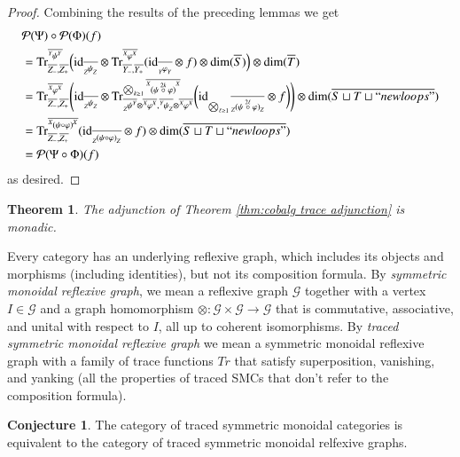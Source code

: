 \documentclass{amsart}
\def\tn{\textnormal}
\def\mc{\mathcal}
\def\dim{\tn{dim}}
\def\Trace{\tn{Tr}}
\def\to{\rightarrow}
\def\taking{\colon}
\def\ol{\overline}
\def\id{\tn{id}}
\def\mcG{\mc{G}}
\def\mcP{\mc{P}}
\newcommand{\inp}[1]{{#1_-}}
\newcommand{\outp}[1]{{#1_+}}
\newcommand{\feeddd}[3]{{\tensor*[^{#2}_{\color{white}{!}}]{{#1}}{^{#3}}}}%
\newcommand{\feeddc}[3]{{\tensor*[^{#2}]{{#1}}{_{#3}}}}
\newcommand{\feedcd}[3]{{\tensor*[_{#2}]{{#1}}{^{#3}}}}
\newcommand{\feedcc}[3]{{\tensor*[^{\color{white}{!}}_{#2}]{{#1}}{_{#3}}}}
\newtheorem{theorem}[subsubsection]{Theorem}
\theoremstyle{remark}
\theoremstyle{definition}
\newtheorem{conjecture}[subsubsection]{Conjecture}
\begin{document}
\begin{proof}
Combining the results of the preceding lemmas we get
\begin{align*}
&\mcP(\Psi)\circ\mcP(\Phi)(f)\\
&=
\Trace^{\ol{\feeddd{\psi}{Y}{Y}}}_{\ol{Z_-},\ol{Z_+}}
\Big(
\id_{\ol{\feedcc{\psi}{Z}{Z}}}\otimes
\Trace^{\ol{\feeddd{\varphi}{X}{X}}}_{\ol{Y_-},\ol{Y_+}}(\id_{\ol{\feedcc{\varphi}{Y}{Y}}}\otimes f)\otimes\dim(\ol{S})
\Big)
\otimes\dim(\ol{T})\\
&=\Trace^{\ol{\feeddd{\varphi}{X}{X}}}_{\ol{\inp{Z}},\ol{\outp{Z}}}
\Bigg(
\id_{\ol{\feedcc{\psi}{Z}{Z}}}\otimes\Trace^{\bigotimes_{k\ge1}\ol{\feeddd{(\psi\;\accentset{2k}{\circ}\;\varphi)}{X}{X}}
}_{\ol{\feedcd{\psi}{Z}{Y}}\otimes\ol{\feeddd{\varphi}{X}{X}},\ol{\feeddc{\psi}{Y}{Z}}\otimes\ol{\feeddd{\varphi}{X}{X}}}
\bigg(
\id_{\bigotimes_{\ell\ge1}\ol{\feedcc{(\psi\;\accentset{2\ell}{\circ}\;\varphi)}{Z}{Z}}
}\otimes f
\bigg)
\Bigg)\otimes\dim(\ol{S\sqcup T\sqcup ``newloops"})\\
&=\Trace^{\ol{\feeddd{(\psi\circ\varphi)}{X}{X}}}_{\ol{Z_-},\ol{Z_+}}(\id_{\ol{\feedcc{(\psi\circ\varphi)}{Z}{Z}}}\otimes f)\otimes\dim(\ol{S\sqcup T\sqcup ``newloops"})\\
&=\mcP(\Psi\circ\Phi)(f)
\end{align*}
as desired.
\end{proof}

\begin{theorem}

The adjunction of Theorem \ref{thm:cobalg trace adjunction} is monadic. 

\end{theorem}

Every category has an underlying reflexive graph, which includes its objects and morphisms (including identities), but not its composition formula. By {\em symmetric monoidal reflexive graph}, we mean a reflexive graph $\mcG$ together with a vertex $I\in \mcG$ and a graph homomorphism $\otimes\taking\mcG\times\mcG\to\mcG$ that is commutative, associative, and unital with respect to $I$, all up to coherent isomorphisms. By {\em traced symmetric monoidal reflexive graph} we mean a symmetric monoidal reflexive graph with a family of trace functions $Tr$ that satisfy superposition, vanishing, and yanking (all the properties of traced SMCs that don't refer to the composition formula).

\begin{conjecture}
The category of traced symmetric monoidal categories is equivalent to the category of traced symmetric monoidal relfexive graphs.
\end{conjecture}
\end{document}
